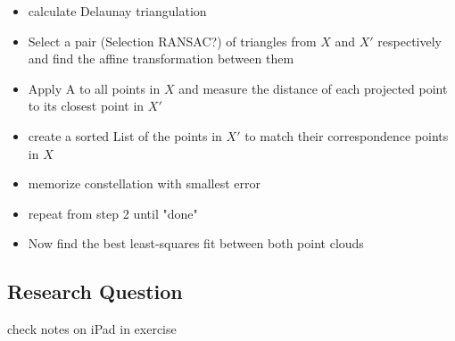 \begin{itemize}
	\item calculate Delaunay triangulation
	\item Select a pair (Selection RANSAC?) of triangles from $X$ and $X'$ respectively and find the affine transformation between them
	\item Apply A to all points in $X$ and measure the distance of each projected point to its closest point in $X'$
	\item create a sorted List of the points in $X'$ to match their correspondence points in $X$
	\item memorize constellation with smallest error
	\item repeat from step 2 until "done"
	\item Now find the best least-squares fit between both point clouds
\end{itemize}

\subsection{Research Question}
check notes on iPad in exercise 